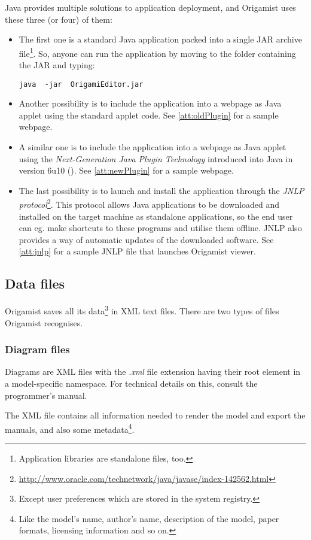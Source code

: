 Java provides multiple solutions to application deployment, and Origamist
uses these three (or four) of them:
\begin{itemize}
\item  The first one is a standard Java application packed into a single JAR archive file\footnote{Application libraries are standalone files, too.}. So, anyone can run the application by moving to the folder containing the JAR and typing:
\begin{verbatim}
java  -jar  OrigamiEditor.jar
\end{verbatim}
\item Another possibility is to include the application into a webpage as Java
applet using the standard applet code. See \ref{att:oldPlugin} for a sample webpage.
\item A similar one is to include the application into a webpage as Java applet
using the \emph{Next-Generation Java Plugin Technology} introduced into Java
in version 6u10 (\cite{newjava}). See \ref{att:newPlugin} for a sample webpage.
\item The last possibility is to launch and install the application through the
\emph{JNLP protocol}\footnote{\url{http://www.oracle.com/technetwork/java/javase/index-142562.html}}.  This protocol allows Java applications to be downloaded and installed on the target machine as standalone applications, so the end user can eg. make shortcuts to these programs and utilise them offline. JNLP also provides a way of automatic updates of the downloaded software. See \ref{att:jnlp} for a sample JNLP file that launches Origamist viewer.
\end{itemize}

\subsection{Data files}
Origamist saves all its data\footnote{Except user preferences which are stored in the system registry.} in XML text files. There are two types of files
Origamist recognises.

\subsubsection{Diagram files}
Diagrams are XML files with the \emph{.xml} file extension having their root element in a model-specific namespace. For technical details on this, consult the programmer's manual. %

The XML file contains all information needed to render the model and export
the manuals, and also some metadata\footnote{Like the model's name, author's name, description of the model, paper formats, licensing information and so on.}.

